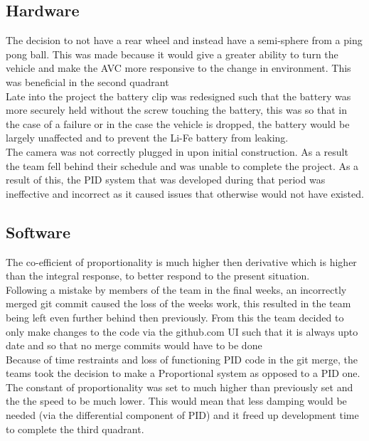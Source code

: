 \documentclass[paper=a4, fontsize=11pt]{scrartcl} %
\numberwithin{equation}{section} %
\numberwithin{figure}{section} %
\begin{document}
\subsection{Hardware}
The decision to not have a rear wheel and instead have a semi-sphere from a ping
pong ball. This was made because it would give a greater ability to turn the
vehicle and make the AVC more responsive to the change in environment. This was
beneficial in the second quadrant\\

Late into the project the battery clip was redesigned such that the battery was
more securely held without the screw touching the battery, this was so that in
the case of a failure or in the case the vehicle is dropped, the battery would
be largely unaffected and to prevent the Li-Fe battery from leaking.\\

The camera was not correctly plugged in upon initial construction.  As a result
the team fell behind their schedule and was unable to complete the project. 
As a result of this, the PID system that was developed during that period was
ineffective and incorrect as it caused issues that otherwise would not have
existed.\\

\subsection{Software}
The co-efficient of proportionality is much higher then derivative which is
higher than the integral response, to better respond to the present situation.\\
Following a mistake by members of the team in the final weeks, an incorrectly
merged git commit caused the loss of the weeks work, this resulted in the team
being left even further behind then previously. From this the team decided to
only make changes to the code via the github.com UI such that it is always upto
date and so that no merge commits would have to be done\\

Because of time restraints and loss of functioning PID code in the git merge,
the teams took the decision to make a Proportional system as opposed to a PID
one. The constant of proportionality was set to much higher than previously set
and the the speed to be much lower. This would mean that less damping would be
needed (via the differential component of PID) and it freed up development time
to complete the third quadrant.\\
\end{document}

